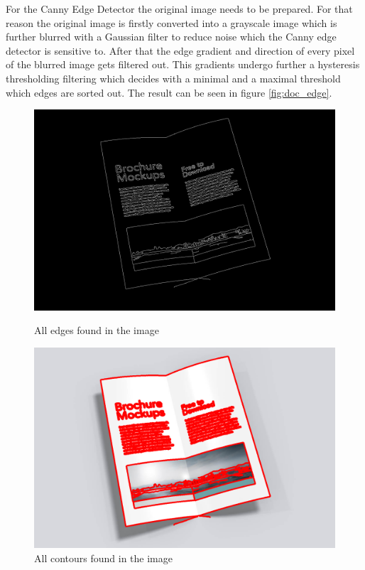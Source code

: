 For the Canny Edge Detector the original image needs to be prepared. For that reason the original image is firstly converted into a grayscale image which is further blurred with a Gaussian filter to reduce noise which the Canny edge detector is sensitive to. After that the edge gradient and direction of every pixel of the blurred image gets filtered out. This gradients undergo further a hysteresis thresholding filtering which decides with a minimal and a maximal threshold which edges are sorted out. \cite{gonzalez} \cite{canny} The result can be seen in figure \ref{fig:doc_edge}.

\begin{figure}[H]
     \centering
     \captionsetup{justification=centering}
     \begin{minipage}[b]{0.5\textwidth}
         \centering
         \includegraphics[width=.95\textwidth]{images/3_folded_doc/edged.png}
        \caption{All edges found in the image}
        \label{fig:doc_edge}
     \end{minipage}%
     \begin{minipage}[b]{0.5\textwidth}
         \centering
         \includegraphics[width=.95\textwidth]{images/3_folded_doc/all_contours.png}
        \caption{All contours found in the image}
        \label{fig:doc_contour}
     \end{minipage}
\end{figure}

